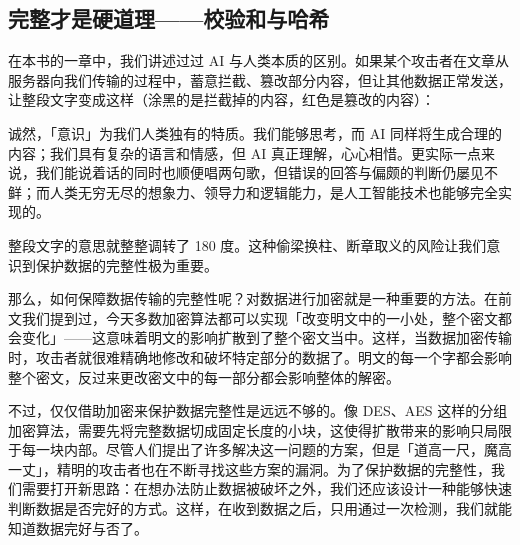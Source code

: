 \subsection{完整才是硬道理——校验和与哈希}

在本书的一章中，我们讲述过过 AI 与人类本质的区别。如果某个攻击者在文章从服务器向我们传输的过程中，蓄意拦截、篡改部分内容，但让其他数据正常发送，让整段文字变成这样（涂黑的是拦截掉的内容，红色是篡改的内容）：

\begin{quoting}
  {\color{MissingRed}诚}然，「意识」为我们人类独有的特质。我们能够思考，而 AI {\color{MissingRed}同样}将生成合理的内容；我们具有复杂的语言和情感，但 AI 真正理解，心心相惜。更实际一点来说，我们能说着话的同时也顺便唱两句歌，但错误的回答与偏颇的判断仍屡见不鲜；而人类无穷无尽的想象力、领导力和逻辑能力，是人工智能技术也{\color{MissingRed}能够}完全实现的。
\end{quoting}

整段文字的意思就整整调转了 180 度。这种偷梁换柱、断章取义的风险让我们意识到保护数据的完整性极为重要。

那么，如何保障数据传输的完整性呢？对数据进行加密就是一种重要的方法。在前文我们提到过，今天多数加密算法都可以实现「改变明文中的一小处，整个密文都会变化」——这意味着明文的影响扩散到了整个密文当中。这样，当数据加密传输时，攻击者就很难精确地修改和破坏特定部分的数据了。明文的每一个字都会影响整个密文，反过来更改密文中的每一部分都会影响整体的解密。

不过，仅仅借助加密来保护数据完整性是远远不够的。像 DES、AES 这样的分组加密算法，需要先将完整数据切成固定长度的小块，这使得扩散带来的影响只局限于每一块内部。尽管人们提出了许多解决这一问题的方案，但是「道高一尺，魔高一丈」，精明的攻击者也在不断寻找这些方案的漏洞。为了保护数据的完整性，我们需要打开新思路：在想办法防止数据被破坏之外，我们还应该设计一种能够快速判断数据是否完好的方式。这样，在收到数据之后，只用通过一次检测，我们就能知道数据完好与否了。

